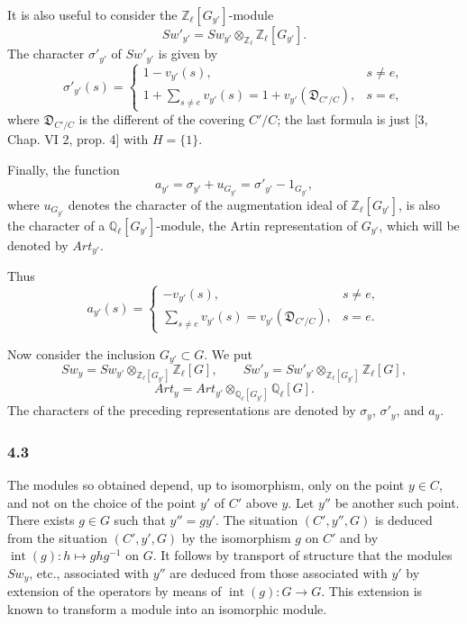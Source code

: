 \documentclass[11pt]{article}
\begin{document}
It is also useful to consider the $\mathbb Z_\ell[G_{y'}]$-module
\[
Sw'_{y'}=Sw_{y'}\otimes_{\mathbb Z_\ell}\mathbb Z_\ell[G_{y'}].
\tag{4.2.3}
\]
The character $\sigma'_{y'}$ of $Sw'_{y'}$ is given by
\[
\sigma'_{y'}(s)=
\begin{cases}
1-v_{y'}(s),& s\ne e,\\[0.4em]
\displaystyle 1+\sum_{s\ne e}v_{y'}(s)
=1+v_{y'}(\mathfrak D_{C'/C}),& s=e,
\end{cases}
\tag{4.2.4}
\]
where $\mathfrak D_{C'/C}$ is the different of the covering $C'/C$; the last formula is just [3, Chap. VI 2, prop. 4] with $H=\{1\}$.

Finally, the function
\[
a_{y'}=\sigma_{y'}+u_{G_{y'}}=\sigma'_{y'}-1_{G_{y'}},
\tag{4.2.5}
\]
where $u_{G_{y'}}$ denotes the character of the augmentation ideal of $\mathbb Z_\ell[G_{y'}]$, is also the character of a $\mathbb Q_\ell[G_{y'}]$-module, the Artin representation of $G_{y'}$, which will be denoted by $Art_{y'}$.

Thus
\[
a_{y'}(s)=
\begin{cases}
-v_{y'}(s),& s\ne e,\\[0.4em]
\displaystyle\sum_{s\ne e}v_{y'}(s)=v_{y'}(\mathfrak D_{C'/C}),& s=e.
\end{cases}
\tag{4.2.6}
\]

Now consider the inclusion $G_{y'}\subset G$. We put
\[
Sw_y=Sw_{y'}\otimes_{\mathbb Z_\ell[G_{y'}]}\mathbb Z_\ell[G],
\qquad
Sw'_y=Sw'_{y'}\otimes_{\mathbb Z_\ell[G_{y'}]}\mathbb Z_\ell[G],
\tag{4.2.7}
\]
\[
Art_y=Art_{y'}\otimes_{\mathbb Q_\ell[G_{y'}]}\mathbb Q_\ell[G].
\tag{4.2.8}
\]
The characters of the preceding representations are denoted by $\sigma_y$, $\sigma'_y$, and $a_y$.

\subsubsection*{4.3}

The modules so obtained depend, up to isomorphism, only on the point $y\in C$, and not on the choice of the point $y'$ of $C'$ above $y$. Let $y''$ be another such point. There exists $g\in G$ such that $y''=g y'$. The situation $(C',y'',G)$ is deduced from the situation $(C',y',G)$ by the isomorphism $g$ on $C'$ and by $\operatorname{int}(g):h\mapsto ghg^{-1}$ on $G$. It follows by transport of structure that the modules $Sw_y$, etc., associated with $y''$ are deduced from those associated with $y'$ by extension of the operators by means of $\operatorname{int}(g):G\to G$. This extension is known to transform a module into an isomorphic module.
\end{document}
